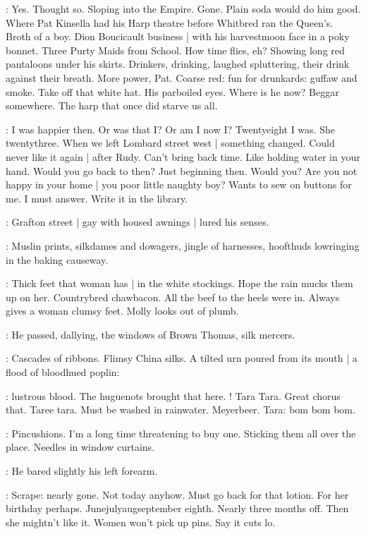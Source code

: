 \BloomInt:
Yes.
Thought so.
Sloping into the Empire.
Gone.
Plain soda would do him good.
Where Pat Kinsella had his Harp theatre
before Whitbred ran the Queen's.
Broth of a boy.
Dion Boucicault business |
with his harvestmoon face in a poky bonnet.
Three Purty Maids from School.
How time flies, eh?
Showing long red pantaloons under his skirts.
Drinkers, drinking, laughed spluttering,
their drink against their breath.
More power, Pat.
Coarse red:
fun for drunkards:
guffaw and smoke.
Take off that white hat.
His parboiled eyes.
Where is he now?
Beggar somewhere.
The harp that once did starve us all.

\BloomInt:
I was happier then.
Or was that I?
Or am I now I?
Twentyeight I was.
She twentythree.
When we left Lombard street west |
something changed.
Could never like it again |
after Rudy.
Can't bring back time.
Like holding water in your hand.
Would you go back to then?
Just beginning then.
Would you?
Are you not happy in your home |
you poor little naughty boy?
Wants to sew on buttons for me.
I must answer.
Write it in the library.

:
Grafton street |
gay with housed awnings |
lured his senses.

:
Muslin prints, silkdames and dowagers,
jingle of harnesses,
hoofthuds lowringing in the baking causeway.

\BloomInt:
Thick feet that woman has |
in the white stockings.
Hope the rain mucks them up on her.
Countrybred chawbacon.
All the beef to the heels were in.
Always gives a woman clumsy feet.
Molly looks out of plumb.

:
He passed, dallying,
the windows of Brown Thomas, silk mercers.

:
Cascades of ribbons.
Flimsy China silks.
A tilted urn poured from its mouth |
a flood of bloodhued poplin:

\BloomInt:
lustrous blood.
The huguenots brought that here.
!
Tara Tara.
Great chorus that.
Taree tara.
Must be washed in rainwater.
Meyerbeer.
Tara:
bom bom bom.

\BloomInt:
Pincushions.
I'm a long time threatening to buy one.
Sticking them all over the place.
Needles in window curtains.

:
He bared slightly his left forearm.

\BloomInt:
Scrape: nearly gone.
Not today anyhow.
Must go back for that lotion.
For her birthday perhaps.
Junejulyaugseptember eighth.
Nearly three months off.
Then she mightn't like it.
Women won't pick up pins.
Say it cuts lo.

